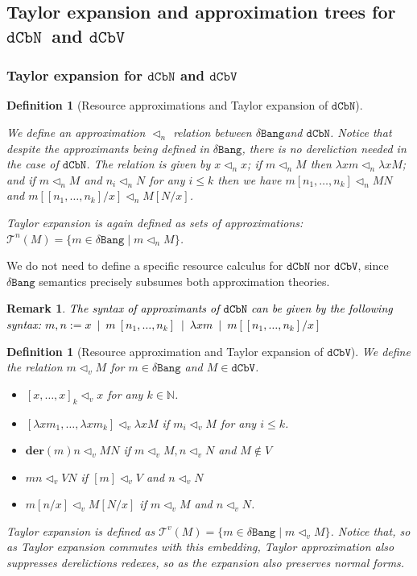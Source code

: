 \documentclass[10pt,a4paper]{article}
\newtheorem{definition}[theorem]{Definition}
\newtheorem{remark}[theorem]{Remark}
\newcommand{\<}{\langle}
\renewcommand{\>}{\rangle}
\newcommand{\alt}{~\mid~}
\newcommand{\der}[1]{\ensuremath{\mathbf{der}(#1)}}
\newcommand{\dcbn}{\ensuremath{\mathtt{dCbN}}}
\newcommand{\dcbv}{\ensuremath{\mathtt{dCbV}}}
\newcommand{\dbangres}{\ensuremath{\mathtt{\delta Bang}}}
\newcommand{\es}[2]{[#1/#2]}
\newcommand{\appv}{\triangleleft_v} %
\newcommand{\appn}{\triangleleft_n} %
\newcommand{\taylorn}[1]{\ensuremath{\mathcal{T}^n(#1)}}
\newcommand{\taylorv}[1]{\ensuremath{\mathcal{T}^v(#1)}}
\newcommand{\fnl}[1]{\textcolor{black}{#1}}
\begin{document}
\subsection{Taylor expansion and  approximation trees for \dcbn\ and \dcbv}


\subsubsection{Taylor expansion for \dcbn{} and \dcbv{}}

\begin{definition}[Resource approximations and Taylor expansion of
	\dcbn]\label{def:dcbn_taylor_approx}~
	
	We define an approximation $\appn$ relation between
		\dbangres and
		\dcbn. Notice that despite the approximants being defined in
		\dbangres, there is no dereliction needed in the case of
		\dcbn. The relation is given by $x\appn x$; if $m\appn M$ then
		$\lambda xm\appn \lambda xM$; and if $m\appn M$ and $n_i\appn
		N$ for any $i\leq k$ then we have $m[n_1,\dots ,n_k]\appn MN$ and
		$m[[n_1,\dots ,n_k]/x]\appn M[N/x]$.

	Taylor expansion is again defined as sets of approximations: $\taylorn
	M=\{m\in\dbangres\mid m\appn M\}$.
\end{definition}
We do not need to define a specific
		resource calculus for \dcbn{} nor \dcbv{}, since \dbangres{}
		semantics precisely subsumes both approximation theories. 

\begin{remark}
	\fnl{The syntax of approximants of \dcbn{} can be given by the
following syntax: $m, n := x \alt m~[n_1, \dots , n_k] \alt \lambda xm
\alt m\es{[n_1, \dots , n_k]}x$}
\end{remark}



\begin{definition}[Resource approximation and Taylor expansion of
	\dcbv]\label{def:dcbv_taylor_approx}
	We define the relation $m\appv M$ for $m\in\dbangres$ and $M\in\dcbv$.
	\begin{itemize}
		\item $[x,\dots ,x]_k\appv x$ for any $k\in\mathbb N$.
		\item $[\lambda xm_1,\dots ,\lambda xm_k]\appv \lambda xM$ if
			$m_i\appv M$ for
			any $i\leq k$.
		\item $ \der mn\appv MN$ if $m\appv M, n\appv N$ and
				$M\notin V$
		\item $mn\appv VN$ if $[m]\appv V$ and $n\appv N$


		\item $m[n/x]\appv M[N/x]$ if $m\appv M$ and $n\appv N$.
	\end{itemize}
	
	Taylor expansion is defined as $\taylorv M=\{m\in\dbangres\mid m\appv
	M\}$. Notice that, so as Taylor expansion commutes with this embedding,
	Taylor approximation also suppresses derelictions redexes, so as the
	expansion also preserves normal forms.
\end{definition}
\end{document}
